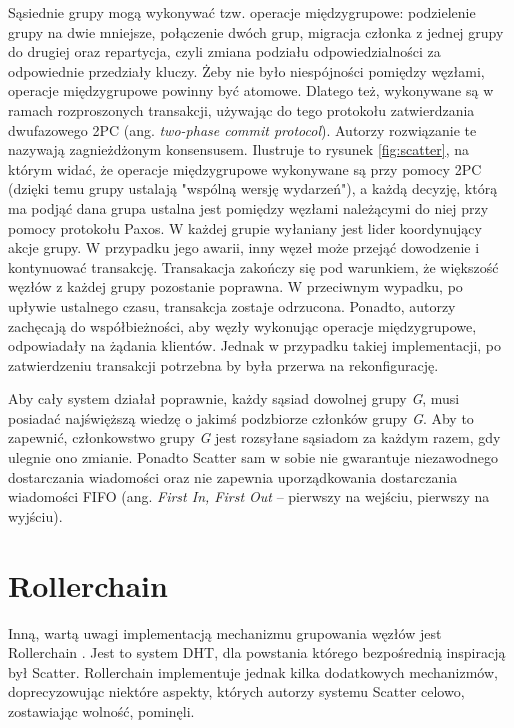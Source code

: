 \documentclass[12pt, twoside, openany]{report}
\begin{document}
Sąsiednie grupy mogą wykonywać tzw. operacje międzygrupowe: podzielenie grupy na dwie mniejsze, połączenie dwóch grup, migracja członka z jednej grupy do drugiej oraz repartycja, czyli zmiana podziału odpowiedzialności za odpowiednie przedziały kluczy. Żeby nie było niespójności pomiędzy węzłami, operacje międzygrupowe powinny być atomowe. Dlatego też, wykonywane są w ramach rozproszonych transakcji, używając do tego protokołu zatwierdzania dwufazowego 2PC (ang. \textit{two-phase commit protocol}). Autorzy rozwiązanie te nazywają zagnieżdżonym konsensusem. Ilustruje to rysunek \ref{fig:scatter}, na którym widać, że operacje międzygrupowe wykonywane są przy pomocy 2PC (dzięki temu grupy ustalają "wspólną wersję wydarzeń"), a każdą decyzję, którą ma podjąć dana grupa ustalna jest pomiędzy węzłami należącymi do niej przy pomocy protokołu Paxos. W każdej grupie wyłaniany jest lider koordynujący akcje grupy. W przypadku jego awarii, inny węzeł może przejąć dowodzenie i kontynuować transakcję. Transakacja zakończy się pod warunkiem, że większość węzłów z każdej grupy pozostanie poprawna. W przeciwnym wypadku, po upływie ustalnego czasu, transakcja zostaje odrzucona. Ponadto, autorzy zachęcają do współbieżności, aby węzły wykonując operacje międzygrupowe, odpowiadały na żądania klientów. Jednak w przypadku takiej implementacji, po zatwierdzeniu transakcji potrzebna by była przerwa na rekonfigurację.

Aby cały system działał poprawnie, każdy sąsiad dowolnej grupy \textit{G}, musi posiadać najświęższą wiedzę o jakimś podzbiorze członków grupy \textit{G}. Aby to zapewnić, członkowstwo grupy \textit{G} jest rozsyłane sąsiadom za każdym razem, gdy ulegnie ono zmianie. Ponadto Scatter sam w sobie nie gwarantuje niezawodnego dostarczania wiadomości oraz nie zapewnia uporządkowania dostarczania wiadomości FIFO (ang. \textit{First In, First Out} – pierwszy na wejściu, pierwszy na wyjściu).

\section{Rollerchain}

Inną, wartą uwagi implementacją mechanizmu grupowania węzłów jest Rollerchain \cite{bib:rollerchain}. Jest to system DHT, dla powstania którego bezpośrednią inspiracją był Scatter. Rollerchain implementuje jednak kilka dodatkowych mechanizmów, doprecyzowując niektóre aspekty, których autorzy systemu Scatter celowo, zostawiając wolność, pominęli.
\end{document}
